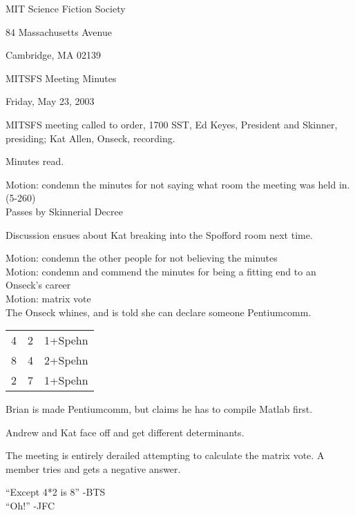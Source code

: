 \documentclass[10pt]{article}
\begin{document}
\begin{center}

MIT Science Fiction Society 

84 Massachusetts Avenue

Cambridge, MA 02139

\vspace{12pt}

MITSFS Meeting Minutes 

Friday, May 23, 2003

\end{center}
 
\vspace{18pt}

\setlength{\parskip}{6pt}

MITSFS meeting called to order, 1700 SST, Ed Keyes, President and
Skinner, presiding; Kat Allen,  Onseck, recording.

Minutes read.

Motion: condemn the minutes for not saying what room the meeting was
held in. (5-260)\\
Passes by Skinnerial Decree

Discussion ensues about Kat breaking into the Spofford room next time.

Motion: condemn the other people for not believing the minutes\\
Motion: condemn and commend the minutes for being a fitting end to an
Onseck's career\\
Motion: matrix vote\\

The Onseck whines, and is told she can declare someone Pentiumcomm.

\begin{tabular}{c|c|c}
4 & 2 & 1+Spehn\\
8 & 4 & 2+Spehn\\
2 & 7 & 1+Spehn\\
\end{tabular}

Brian is made Pentiumcomm, but claims he has to compile Matlab first.

Andrew and Kat face off and get different determinants.

The meeting is entirely derailed attempting to calculate the matrix
vote. A member tries and gets a negative answer.

``Except 4*2 is 8'' -BTS\\
``Oh!'' -JFC\\
\end{document}
